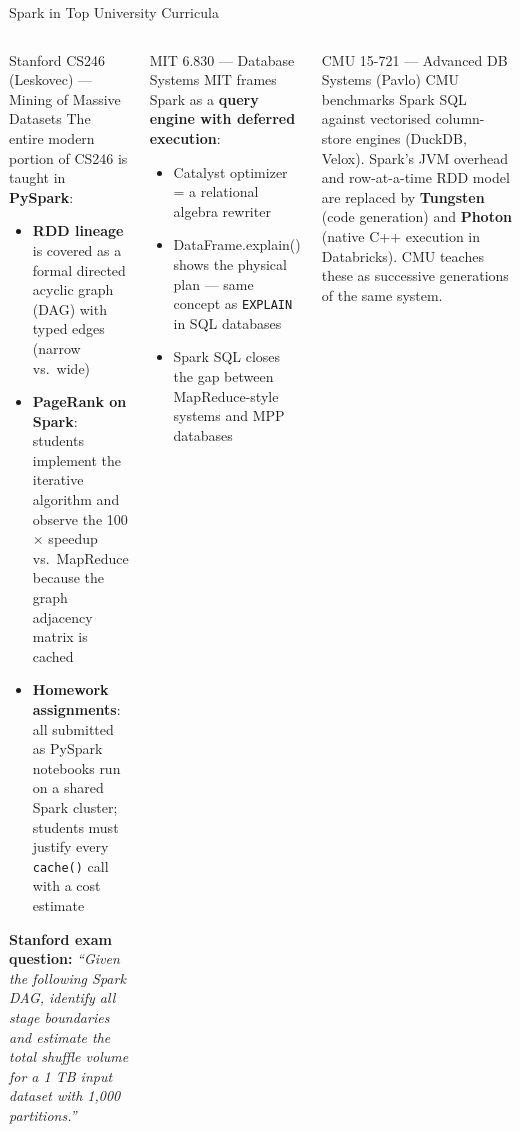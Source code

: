 \documentclass[aspectratio=169,10pt]{beamer}
\begin{document}
\begin{frame}{Spark in Top University Curricula}
  \begin{columns}[T]
      \begin{block}{Stanford CS246 (Leskovec) — Mining of Massive Datasets}
        \small The entire modern portion of CS246 is taught in \textbf{PySpark}:
        \begin{itemize}
          \item \textbf{RDD lineage} is covered as a formal directed acyclic graph (DAG) with typed edges (narrow vs.\ wide)
          \item \textbf{PageRank on Spark}: students implement the iterative algorithm and observe the 100$\times$ speedup vs.\ MapReduce because the graph adjacency matrix is cached
          \item \textbf{Homework assignments}: all submitted as PySpark notebooks run on a shared Spark cluster; students must justify every \texttt{cache()} call with a cost estimate
        \end{itemize}
        \textbf{Stanford exam question:} \textit{``Given the following Spark DAG, identify all stage boundaries and estimate the total shuffle volume for a 1 TB input dataset with 1{,}000 partitions.''}
      \end{block}

      \begin{exampleblock}{MIT 6.830 — Database Systems}
        \small MIT frames Spark as a \textbf{query engine with deferred execution}:
        \begin{itemize}
          \item Catalyst optimizer = a relational algebra rewriter
          \item DataFrame.explain() shows the physical plan — same concept as \texttt{EXPLAIN} in SQL databases
          \item Spark SQL closes the gap between MapReduce-style systems and MPP databases
        \end{itemize}
      \end{exampleblock}
      \vspace{4pt}
      \begin{alertblock}{CMU 15-721 — Advanced DB Systems (Pavlo)}
        \small CMU benchmarks Spark SQL against vectorised column-store engines (DuckDB, Velox).  Spark's JVM overhead and row-at-a-time RDD model are replaced by \textbf{Tungsten} (code generation) and \textbf{Photon} (native C++ execution in Databricks).  CMU teaches these as successive generations of the same system.
      \end{alertblock}
  \end{columns}
\end{frame}
\end{document}
